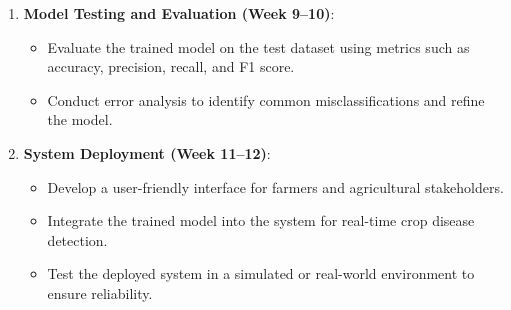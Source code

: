 \begin{enumerate}
    \item \textbf{Model Testing and Evaluation (Week 9–10)}:
    \begin{itemize}
        \item Evaluate the trained model on the test dataset using metrics such as accuracy, precision, recall, and F1 score.
        \item Conduct error analysis to identify common misclassifications and refine the model.
    \end{itemize}

    \item \textbf{System Deployment (Week 11–12)}:
    \begin{itemize}
        \item Develop a user-friendly interface for farmers and agricultural stakeholders.
        \item Integrate the trained model into the system for real-time crop disease detection.
        \item Test the deployed system in a simulated or real-world environment to ensure reliability.
    \end{itemize}
\end{enumerate}
\newpage
